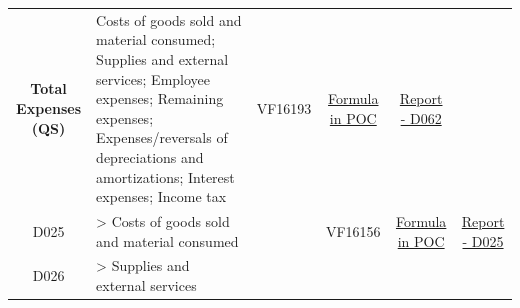 \documentclass[]{book}
\begin{document}
\begin{longtable}[]{@{}cllccc@{}}
\begin{minipage}[t]{0.20\columnwidth}
\textbf{Total Expenses (QS)}\strut
\end{minipage} & \begin{minipage}[t]{0.16\columnwidth}\raggedright
Costs of goods sold and material consumed; Supplies and external services; Employee expenses; Remaining expenses; Expenses/reversals of depreciations and amortizations; Interest expenses; Income tax\strut
\end{minipage} & \begin{minipage}[t]{0.09\columnwidth}\centering
VF16193\strut
\end{minipage} & \begin{minipage}[t]{0.15\columnwidth}\centering
\protect\hyperlink{d062---formula-in-poc}{Formula in POC}\strut
\end{minipage} & \begin{minipage}[t]{0.16\columnwidth}\centering
\href{./Auxiliary\%20Files/technical_reports/variable_report/D062(!).pdf}{Report - D062}\strut
\end{minipage}\tabularnewline
\begin{minipage}[t]{0.08\columnwidth}\centering
D025\strut
\end{minipage} & \begin{minipage}[t]{0.20\columnwidth}\raggedright
\textgreater{} Costs of goods sold and material consumed\strut
\end{minipage} & \begin{minipage}[t]{0.16\columnwidth}\raggedright
\strut
\end{minipage} & \begin{minipage}[t]{0.09\columnwidth}\centering
VF16156\strut
\end{minipage} & \begin{minipage}[t]{0.15\columnwidth}\centering
\protect\hyperlink{d025---formula-in-poc}{Formula in POC}\strut
\end{minipage} & \begin{minipage}[t]{0.16\columnwidth}\centering
\href{./Auxiliary\%20Files/technical_reports/variable_report/D025.pdf}{Report - D025}\strut
\end{minipage}\tabularnewline
\begin{minipage}[t]{0.08\columnwidth}\centering
D026\strut
\end{minipage} & \begin{minipage}[t]{0.20\columnwidth}\raggedright
\textgreater{} Supplies and external services\strut
\end{minipage} & \begin{minipage}[t]{0.16\columnwidth}\raggedright

\end{minipage}
\end{longtable}
\end{document}

